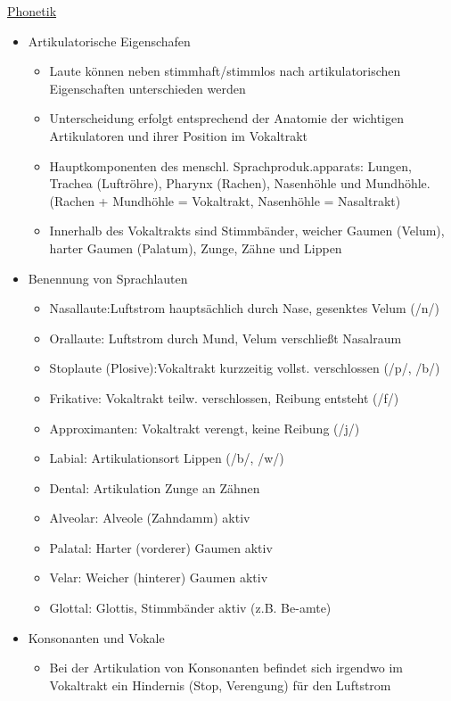 \documentclass[a4paper,10pt,oneside]{article}
\begin{document}
\underline{Phonetik} \\
	\begin{itemize}
		\item Artikulatorische Eigenschafen
			\begin{itemize}
				\item Laute können neben stimmhaft/stimmlos nach artikulatorischen Eigenschaften unterschieden werden
				\item Unterscheidung erfolgt entsprechend der Anatomie der wichtigen Artikulatoren und ihrer Position im Vokaltrakt
				\item Hauptkomponenten des menschl. Sprachproduk.apparats: Lungen, Trachea (Luftröhre), Pharynx (Rachen), Nasenhöhle und Mundhöhle. (Rachen + Mundhöhle = Vokaltrakt, Nasenhöhle = Nasaltrakt)
				\item Innerhalb des Vokaltrakts sind Stimmbänder, weicher Gaumen (Velum), harter Gaumen (Palatum), Zunge, Zähne und Lippen
			\end{itemize}
		\item Benennung von Sprachlauten
			\begin{itemize}
				\item Nasallaute:Luftstrom hauptsächlich durch Nase, gesenktes Velum (/n/)
				\item Orallaute: Luftstrom durch Mund, Velum verschließt Nasalraum
				\item Stoplaute (Plosive):Vokaltrakt kurzzeitig vollst. verschlossen (/p/, /b/)
				\item Frikative: Vokaltrakt teilw. verschlossen, Reibung entsteht (/f/)
				\item Approximanten: Vokaltrakt verengt, keine Reibung (/j/)
				\item Labial: Artikulationsort Lippen (/b/, /w/)
				\item Dental: Artikulation Zunge an Zähnen
				\item Alveolar: Alveole (Zahndamm) aktiv
				\item Palatal: Harter (vorderer) Gaumen aktiv
				\item Velar: Weicher (hinterer) Gaumen aktiv
				\item Glottal: Glottis, Stimmbänder aktiv (z.B. Be-amte)			
			\end{itemize}
		\item Konsonanten und Vokale
			\begin{itemize}
				\item Bei der Artikulation von Konsonanten befindet sich irgendwo im Vokaltrakt ein Hindernis (Stop, Verengung) für den Luftstrom

\end{itemize}
\end{itemize}
\end{document}

